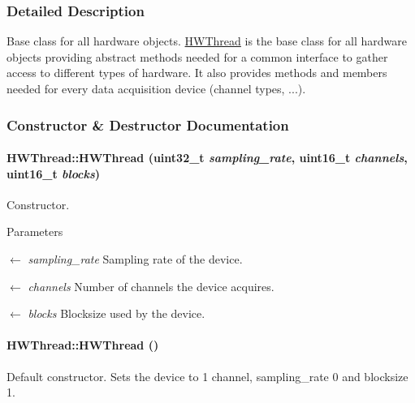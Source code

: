 \subsubsection{Detailed Description}
Base class for all hardware objects. \hyperlink{class_h_w_thread}{HWThread} is the base class for all hardware objects providing abstract methods needed for a common interface to gather access to different types of hardware. It also provides methods and members needed for every data acquisition device (channel types, ...). 

\subsubsection{Constructor \& Destructor Documentation}
\hypertarget{class_h_w_thread_abd12983f14c80f7fdc515c793f40cf5f}{
\paragraph[{HWThread}]{\setlength{\rightskip}{0pt plus 5cm}HWThread::HWThread (uint32\_\-t {\em sampling\_\-rate}, \/  uint16\_\-t {\em channels}, \/  uint16\_\-t {\em blocks})}\hfill}
\label{class_h_w_thread_abd12983f14c80f7fdc515c793f40cf5f}


Constructor. 
\begin{DoxyParams}{Parameters}
\item[\mbox{$\leftarrow$} {\em sampling\_\-rate}]Sampling rate of the device. \item[\mbox{$\leftarrow$} {\em channels}]Number of channels the device acquires. \item[\mbox{$\leftarrow$} {\em blocks}]Blocksize used by the device. \end{DoxyParams}
\hypertarget{class_h_w_thread_a2b7ecb5fc242836db457edba0fcac11e}{
\paragraph[{HWThread}]{\setlength{\rightskip}{0pt plus 5cm}HWThread::HWThread ()}\hfill}
\label{class_h_w_thread_a2b7ecb5fc242836db457edba0fcac11e}


Default constructor. Sets the device to 1 channel, sampling\_\-rate 0 and blocksize 1. 

